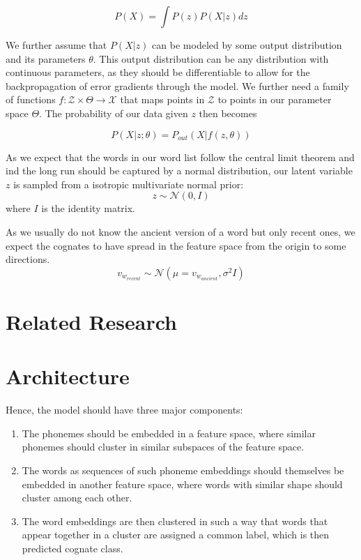 \documentclass[8pt]{article}
\begin{document}
\begin{equation}
P(X) = \int P(z)P(X|z)dz
\end{equation}

We further assume that $P(X|z)$ can be modeled by some output distribution and its parameters $\theta$.  This output distribution can be any distribution with continuous parameters, as they should be differentiable to allow for the backpropagation of error gradients through the model. We further need a family of functions $f : \mathcal{Z} \times  \Theta \rightarrow \mathcal{X}$ that maps points in $\mathcal{Z}$ to points in our parameter space $\Theta$. The probability of our data given $z$ then becomes

\begin{equation}
P(X|z;\theta) = P_{out}(X|f(z,\theta))
\end{equation}

As we expect that the words in our word list follow the central limit theorem and ind the long run should be captured by a normal distribution, our latent variable $z$ is sampled from a isotropic multivariate normal prior:
\begin{equation}
z \sim \mathcal{N}(0,I)
\end{equation}
where $I$ is the identity matrix. 



As we usually do not know the ancient version of a word but only recent ones, we expect the cognates to have spread in the feature space from the origin to some directions.
\begin{equation}
v_{w_{recent}} \sim \mathcal{N}(\mu = v_{w_{ancient}},\sigma ^2 I)
\end{equation}

\section{Related Research}
\section{Architecture}
Hence, the model should have three major components:
\begin{enumerate}
\item The phonemes should be embedded in a feature space, where similar phonemes should cluster in similar subspaces of the feature space. 
\item The words as sequences of such phoneme embeddings should themselves be embedded in another feature space, where words with similar shape should cluster among each other. 
\item The word embeddings are then clustered in such a way that words that appear together in a cluster are assigned a common label, which is then predicted cognate class.
\end{enumerate}
\end{document}
